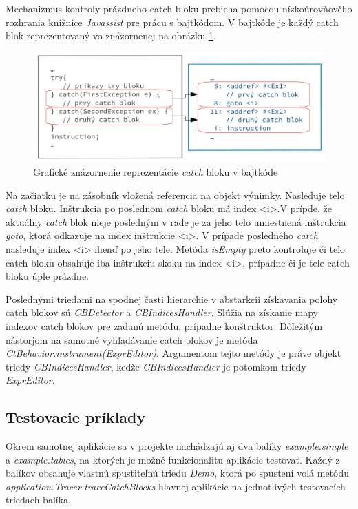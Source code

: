 \documentclass[11pt,final,oneside]{fithesis}
\begin{document}
Mechanizmus kontroly prázdneho catch bloku prebieha pomocou nízkoúrovňového rozhrania knižnice \textit{Javassist} pre prácu s bajtkódom. V bajtkóde je každý catch blok reprezentovaný vo znázornenej na obrázku \ref{fig:catch}.

\begin{figure}[h]
  \centering
   \includegraphics[width=\textwidth]{catch.png}
  \caption{Grafické znázornenie reprezentácie \textit{catch} bloku v bajtkóde}
  \label{fig:catch}
\end{figure}

Na začiatku je na zásobník vložená referencia na objekt výnimky. Nasleduje telo \textit{catch} bloku. Inštrukcia po poslednom \textit{catch} bloku má index <i>.V prípde, že aktuálny \textit{catch} blok nieje posledným v rade je za jeho telo umiestnená inštrukcia \textit{goto}, ktorá odkazuje na index inštrukcie <i>. V prípade posledného \textit{catch} nasleduje index <i> ihenď po jeho tele.
Metóda \textit{isEmpty} preto kontroluje či telo catch bloku obsahuje iba inštrukciu skoku na index <i>, prípadne či je tele catch bloku úple prázdne. 

Poslednými triedami na spodnej časti hierarchie v abstarkcii získavania polohy catch blokov sú \textit{CBDetector} a \textit{CBIndicesHandler}. Slúžia na získanie mapy indexov catch blokov pre zadanú metódu, prípadne konštruktor. Dôležitým nástorjom na samotné vyhľadávanie catch blokov je metóda \textit{CtBehavior.instrument(ExprEditor)}. Argumentom tejto metódy je práve objekt triedy \textit{CBIndicesHandler}, keďže \textit{CBIndicesHandler} je potomkom triedy \textit{ExprEditor}.

\subsection{Testovacie príklady}

Okrem samotnej aplikácie sa v projekte nachádzajú aj dva balíky \textit{example.simple} a \textit{example.tables}, na ktorých je možné funkcionalitu aplikácie testovať. Každý z balíkov obsahuje vlastnú spustiteľnú triedu \textit{Demo}, ktorá po spustení volá metódu \textit{application.Tracer.traceCatchBlocks} hlavnej aplikácie na jednotlivých testovacích triedach balíka. 
\end{document}
